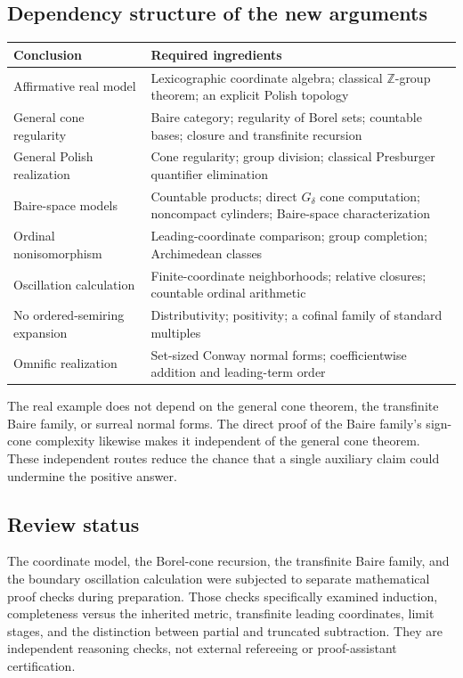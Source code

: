 \documentclass[11pt]{article}
\numberwithin{equation}{section}
\theoremstyle{definition}
\theoremstyle{remark}
\newcommand{\Z}{\mathbb Z}
\begin{document}
\subsection{Dependency structure of the new arguments}

\begin{center}
\small
\begin{tabular}{>{\raggedright\arraybackslash}p{}>{\raggedright\arraybackslash}p{}}
\toprule
Conclusion & Required ingredients\\
\midrule
Affirmative real model & Lexicographic coordinate algebra; classical $\Z$-group theorem; an explicit Polish topology\\
General cone regularity & Baire category; regularity of Borel sets; countable bases; closure and transfinite recursion\\
General Polish realization & Cone regularity; group division; classical Presburger quantifier elimination\\
Baire-space models & Countable products; direct $G_\delta$ cone computation; noncompact cylinders; Baire-space characterization\\
Ordinal nonisomorphism & Leading-coordinate comparison; group completion; Archimedean classes\\
Oscillation calculation & Finite-coordinate neighborhoods; relative closures; countable ordinal arithmetic\\
No ordered-semiring expansion & Distributivity; positivity; a cofinal family of standard multiples\\
Omnific realization & Set-sized Conway normal forms; coefficientwise addition and leading-term order\\
\bottomrule
\end{tabular}
\end{center}

The real example does not depend on the general cone theorem, the
transfinite Baire family, or surreal normal forms. The direct proof of
the Baire family's sign-cone complexity likewise makes it independent
of the general cone theorem. These independent routes reduce the chance
that a single auxiliary claim could undermine the positive answer.

\subsection{Review status}

The coordinate model, the Borel-cone recursion, the transfinite Baire
family, and the boundary oscillation calculation were subjected to
separate mathematical proof checks during preparation. Those checks
specifically examined induction, completeness versus the inherited metric,
transfinite leading coordinates, limit stages, and the distinction between
partial and truncated subtraction. They are independent reasoning checks,
not external refereeing or proof-assistant certification.
\end{document}
